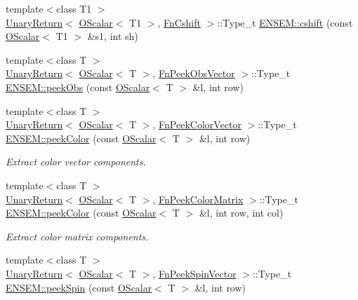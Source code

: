 \begin{DoxyCompactItemize}
\item 
{\footnotesize template$<$class T1 $>$ }\\\mbox{\hyperlink{structENSEM_1_1UnaryReturn}{Unary\+Return}}$<$ \mbox{\hyperlink{classENSEM_1_1OScalar}{O\+Scalar}}$<$ T1 $>$, \mbox{\hyperlink{structENSEM_1_1FnCshift}{Fn\+Cshift}} $>$\+::Type\+\_\+t \mbox{\hyperlink{group__obsscalar_ga6e281512474808f7e211836b3d6607f3}{E\+N\+S\+E\+M\+::cshift}} (const \mbox{\hyperlink{classENSEM_1_1OScalar}{O\+Scalar}}$<$ T1 $>$ \&s1, int sh)
\item 
{\footnotesize template$<$class T $>$ }\\\mbox{\hyperlink{structENSEM_1_1UnaryReturn}{Unary\+Return}}$<$ \mbox{\hyperlink{classENSEM_1_1OScalar}{O\+Scalar}}$<$ T $>$, \mbox{\hyperlink{structENSEM_1_1FnPeekObsVector}{Fn\+Peek\+Obs\+Vector}} $>$\+::Type\+\_\+t \mbox{\hyperlink{group__obsscalar_ga39239dd32aa731cde63bf4ecdafd30a4}{E\+N\+S\+E\+M\+::peek\+Obs}} (const \mbox{\hyperlink{classENSEM_1_1OScalar}{O\+Scalar}}$<$ T $>$ \&l, int row)
\item 
{\footnotesize template$<$class T $>$ }\\\mbox{\hyperlink{structENSEM_1_1UnaryReturn}{Unary\+Return}}$<$ \mbox{\hyperlink{classENSEM_1_1OScalar}{O\+Scalar}}$<$ T $>$, \mbox{\hyperlink{structENSEM_1_1FnPeekColorVector}{Fn\+Peek\+Color\+Vector}} $>$\+::Type\+\_\+t \mbox{\hyperlink{group__obsscalar_ga8f3e69e2d0f4a46a99f719e70d6a13d8}{E\+N\+S\+E\+M\+::peek\+Color}} (const \mbox{\hyperlink{classENSEM_1_1OScalar}{O\+Scalar}}$<$ T $>$ \&l, int row)
\begin{DoxyCompactList}\small\item\em Extract color vector components. \end{DoxyCompactList}\item 
{\footnotesize template$<$class T $>$ }\\\mbox{\hyperlink{structENSEM_1_1UnaryReturn}{Unary\+Return}}$<$ \mbox{\hyperlink{classENSEM_1_1OScalar}{O\+Scalar}}$<$ T $>$, \mbox{\hyperlink{structENSEM_1_1FnPeekColorMatrix}{Fn\+Peek\+Color\+Matrix}} $>$\+::Type\+\_\+t \mbox{\hyperlink{group__obsscalar_gabb496d1fb0c0682ec483697e6dae0e32}{E\+N\+S\+E\+M\+::peek\+Color}} (const \mbox{\hyperlink{classENSEM_1_1OScalar}{O\+Scalar}}$<$ T $>$ \&l, int row, int col)
\begin{DoxyCompactList}\small\item\em Extract color matrix components. \end{DoxyCompactList}\item 
{\footnotesize template$<$class T $>$ }\\\mbox{\hyperlink{structENSEM_1_1UnaryReturn}{Unary\+Return}}$<$ \mbox{\hyperlink{classENSEM_1_1OScalar}{O\+Scalar}}$<$ T $>$, \mbox{\hyperlink{structENSEM_1_1FnPeekSpinVector}{Fn\+Peek\+Spin\+Vector}} $>$\+::Type\+\_\+t \mbox{\hyperlink{group__obsscalar_gad99eae88a001d667225b11a6f8b73d7e}{E\+N\+S\+E\+M\+::peek\+Spin}} (const \mbox{\hyperlink{classENSEM_1_1OScalar}{O\+Scalar}}$<$ T $>$ \&l, int row)

\end{DoxyCompactItemize}
